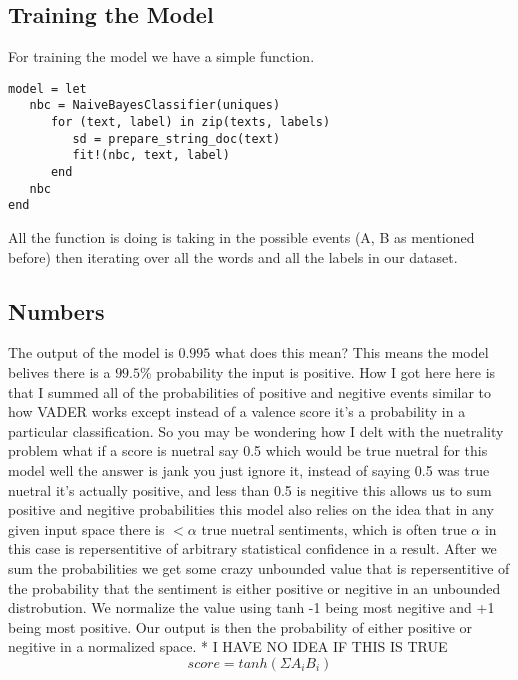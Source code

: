 \documentclass[12pt]{article}
\begin{document}
\subsection{Training the Model}
For training the model we have a simple function.
\begin{verbatim}
model = let
   nbc = NaiveBayesClassifier(uniques)
      for (text, label) in zip(texts, labels)
         sd = prepare_string_doc(text)
         fit!(nbc, text, label)
      end
   nbc
end
\end{verbatim}
All the function is doing is taking in the possible events (A, B as mentioned before) then iterating over all the words and
all the labels in our dataset.

\subsection{Numbers}
The output of the model is $0.995$ what does this mean? This means the model belives there is a $99.5\%$ probability the input is
positive. How I got here here is that I summed all of the probabilities of positive and negitive events similar to how VADER works except
instead of a valence score it's a probability in a particular classification. So you may be wondering how I delt with the nuetrality problem
what if a score is nuetral say 0.5 which would be true nuetral for this model well the answer is jank you just ignore it, instead of saying
0.5 was true nuetral it's actually positive, and less than 0.5 is negitive this allows us to sum positive and negitive probabilities
this model also relies on the idea that in any given input space there is $<\alpha$ true nuetral sentiments, which is often true $\alpha$ in
this case is repersentitive of arbitrary statistical confidence in a result. After we sum the probabilities we get some crazy unbounded value
that is repersentitive of the probability that the sentiment is either positive or negitive in an unbounded distrobution. We normalize the value
using tanh -1 being most negitive and +1 being most positive. Our output is then the probability of either
positive or negitive in a normalized space. * I HAVE NO IDEA IF THIS IS TRUE
$$
score = tanh(\Sigma{}A_i B_i)
$$
\end{document}
